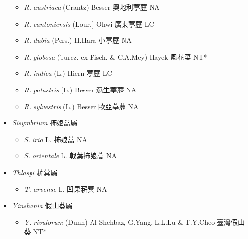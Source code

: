 \begin{itemize}
  \begin{itemize}
        \item[] \textit{R. austriaca} (Crantz) Besser  奧地利葶藶   NA
        \item[] \textit{R. cantoniensis} (Lour.) Ohwi  廣東葶藶   LC
        \item[] \textit{R. dubia} (Pers.) H.Hara  小葶藶   NA
        \item[] \textit{R. globosa} (Turcz. ex Fisch. \& C.A.Mey) Hayek  風花菜   NT*
        \item[] \textit{R. indica} (L.) Hiern  葶藶   LC
        \item[] \textit{R. palustris} (L.) Besser  濕生葶藶   NA
        \item[] \textit{R. sylvestris} (L.) Besser  歐亞葶藶   NA
  \end{itemize}
 \item[] \textit{Sisymbrium} 抪娘蒿屬
                                
  \begin{itemize}
        \item[] \textit{S. irio} L.  抪娘蒿   NA
        \item[] \textit{S. orientale} L.  戟葉抪娘蒿   NA
  \end{itemize}
 \item[] \textit{Thlaspi} 菥蓂屬
                                
  \begin{itemize}
        \item[] \textit{T. arvense} L.  凹果菥蓂   NA
  \end{itemize}
 \item[] \textit{Yinshania} 假山葵屬
                                
  \begin{itemize}
        \item[] \textit{Y. rivulorum} (Dunn) Al-Shehbaz, G.Yang, L.L.Lu \& T.Y.Cheo  臺灣假山葵   NT*
  \end{itemize}
  \end{itemize}

